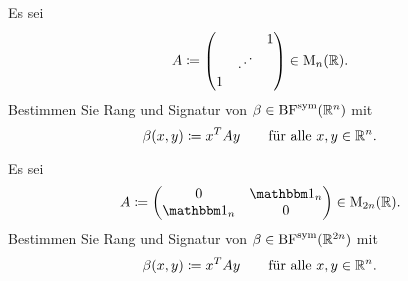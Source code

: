 \documentclass[a4paper, 10pt]{scrartcl}
\begin{document}





\begin{question}
  Es sei
  \[
              A
    \coloneqq \begin{pmatrix}
                  &         & 1 \\
                  & \iddots &   \\
                1 &         &
              \end{pmatrix}
    \in \operatorname{M}_{n}(\mathbb{R}).
  \]
  Bestimmen Sie Rang und Signatur von $\beta \in \operatorname{BF}^{\operatorname{sym}}(\mathbb{R}^n)$ mit
  \[
              \beta(x,y)
    \coloneqq x^T A y
    \qquad
    \text{für alle $x, y \in \mathbb{R}^n$}.
  \]
\end{question}





\begin{question}
  Es sei
  \[
              A
    \coloneqq \begin{pmatrix}
                0     & \Id_n \\
                \Id_n & 0
              \end{pmatrix}
    \in       \matrices{2n}{\Real}.
  \]
  Bestimmen Sie Rang und Signatur von $\beta \in \operatorname{BF}^{\operatorname{sym}}(\mathbb{R}^{2n})$ mit
  \[
              \beta(x,y)
    \coloneqq x^T A y
    \qquad
    \text{für alle $x, y \in \mathbb{R}^n$}.
  \]
\end{question}
\end{document}
